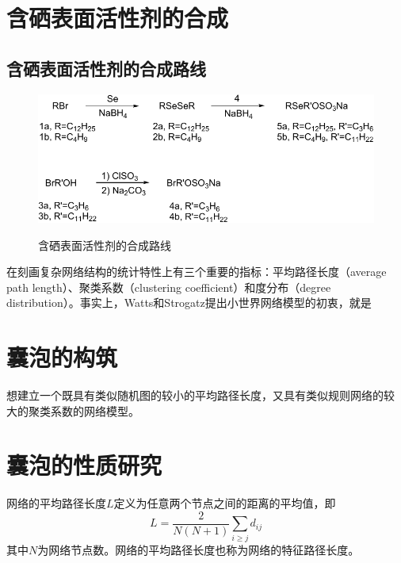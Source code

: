 \documentclass[bachelor,winfonts]{jnuthesis} %
\begin{document}
    \section{含硒表面活性剂的合成}
    \subsection{含硒表面活性剂的合成路线}
    \begin{figure}[htbp]
        \centering
        \includegraphics[]{Figure/synthesis.pdf}\\
        \caption{含硒表面活性剂的合成路线}\label{fig:synthesis}
    \end{figure}
    
    在刻画复杂网络结构的统计特性上有三个重要的指标：平均路径长度（average
    path length）、聚类系数（clustering coefficient）和度分布（degree
    distribution）。事实上，Watts和Strogatz提出小世界网络模型的初衷，就是
    
    \section{囊泡的构筑}
    
    想建立一个既具有类似随机图的较小的平均路径长度，又具有类似规则网络的较
    大的聚类系数的网络模型。
    
    \section{囊泡的性质研究}
    
    \begin{definition}[平均路径长度]
        网络的平均路径长度$L$定义为任意两个节点之间的距离的平均值，即
        \begin{equation}\label{eq:avarage_path_lentgh}
        L = \frac{2}{N(N+1)}\sum_{i\geq j}d_{ij}
        \end{equation}
        其中$N$为网络节点数。网络的平均路径长度也称为网络的特征路径长度。
    \end{definition}
    
\end{document}
